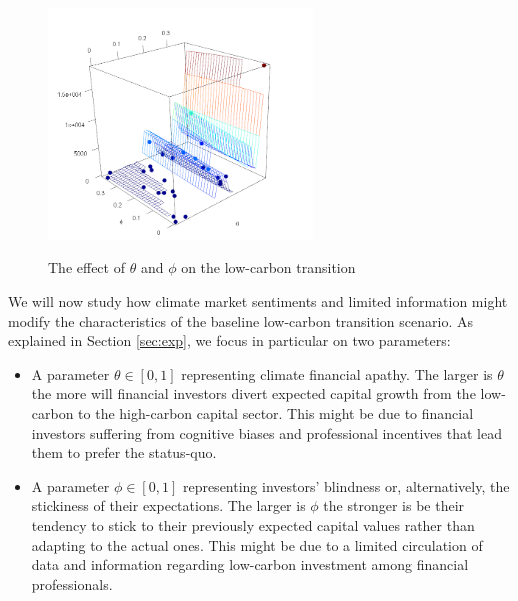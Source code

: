 \documentclass[authoryear]{article}
\begin{document}
\begin{figure}[h!]
\begin{minipage}[b]{.5\linewidth}
    \label{Fig:SensPhysStrand}
\end{minipage}
  \quad \quad 
    \begin{minipage}[b]{.5\linewidth}
\centering\large 
    \includegraphics[width=7cm]{Figures/SensFinancialCapitalisation.png}
    \label{Fig:SensFinStrand}
\end{minipage}
\vspace{0.2cm}
\caption{The effect of $\theta$ and $\phi$ on the low-carbon transition}\label{Fig:sensitivity}
\end{figure}



We will now study how climate market sentiments and limited information might modify the characteristics of the baseline low-carbon transition scenario. As explained in Section \ref{sec:exp}, we focus in particular on two parameters:
\begin{itemize}[noitemsep,nolistsep,leftmargin=*]
\item A parameter $\theta\in[0,1]$ representing climate financial apathy. The larger is $\theta$ the more will financial investors divert expected capital growth from the low-carbon to the high-carbon capital sector. This might be due to financial investors suffering from cognitive biases and professional incentives that lead them to prefer the status-quo. 
\item A parameter $\phi\in[0,1]$ representing investors’ blindness or, alternatively, the stickiness of their expectations. The larger is $\phi$ the stronger is be their tendency to stick to their previously expected capital values rather than adapting to the actual ones. This might be due to a limited circulation of data and information regarding low-carbon investment among financial professionals.
\end{itemize}
\end{document}
